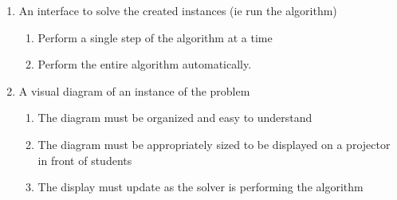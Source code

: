 \begin{enumerate}
\begin{enumerate}
		\item An interface to solve the created instances (ie run the algorithm)
		\begin{enumerate}
			\item Perform a single step of the algorithm at a time
			\item Perform the entire algorithm automatically.
		\end{enumerate}
		\item A visual diagram of an instance of the problem
		\begin{enumerate}
			\item The diagram must be organized and easy to understand
			\item The diagram must be appropriately sized to be displayed
				on a projector in front of students
			\item The display must update as the solver is performing the algorithm
		\end{enumerate}
	\end{enumerate}
\end{enumerate}
